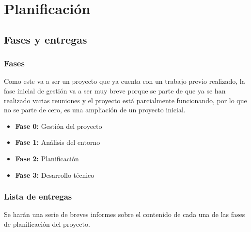 \chapter{Planificación}

\section{Fases y entregas}

\subsection{Fases}

Como este va a ser un proyecto que ya cuenta con un trabajo previo realizado, la fase inicial de gestión va a ser muy breve
porque se parte de que ya se han realizado varias reuniones y el proyecto está parcialmente funcionando, por lo que no se parte
de cero, es una ampliación de un proyecto inicial.

\begin{itemize}
  \item \textbf{Fase 0:} Gestión del proyecto
  \item \textbf{Fase 1:} Análisis del entorno
  \item \textbf{Fase 2:} Planificación
  \item \textbf{Fase 3:} Desarrollo técnico
\end{itemize}

\subsection{Lista de entregas}

Se harán una serie de breves informes sobre el contenido de cada una de las fases de planificación del proyecto.

